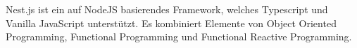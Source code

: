 Nest.js ist ein auf NodeJS basierendes Framework, welches Typescript und Vanilla JavaScript unterstützt. Es kombiniert Elemente von Object Oriented Programming, Functional Programming und Functional Reactive Programming. 